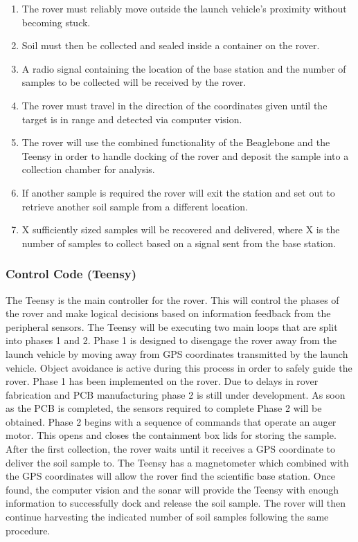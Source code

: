 \documentclass[journal,10pt,draftclsnofoot,onecolumn,compsoc]{IEEEtran} \usepackage[margin=0.75in]{geometry}
\begin{document}
\begin{enumerate}
    \item The rover must reliably move outside the launch vehicle’s proximity without becoming stuck. 
    \item Soil must then be collected and sealed inside a container on the rover. 
    \item A radio signal containing the location of the base station and the number of samples to be collected will be received by the rover. 
    \item The rover must travel in the direction of the coordinates given until the target is in range and detected via computer vision.
    \item The rover will use the combined functionality of the Beaglebone and the Teensy in order to handle docking of the rover and deposit the sample into a collection chamber for analysis.
    \item If another sample is required the rover will exit the station and set out to retrieve another soil sample from a different location. 
    \item X sufficiently sized samples will be recovered and delivered, where X is the number of samples to collect based on a signal sent from the base station. 
\end{enumerate}


\subsubsection{ Control Code (Teensy)}

The Teensy is the main controller for the rover. This will control the phases of the rover and make logical decisions based on information feedback from the peripheral sensors. The Teensy will be executing two main loops that are split into phases 1 and 2. Phase 1 is designed to disengage the rover away from the launch vehicle by moving away from GPS coordinates transmitted by the launch vehicle. Object avoidance is active during this process in order to safely guide the rover. Phase 1 has been implemented on the rover. Due to delays in rover fabrication and PCB manufacturing phase 2 is still under development. As soon as the PCB is completed,  the sensors required to complete Phase 2 will be obtained. Phase 2 begins with a sequence of commands that operate an auger motor. This opens and closes the containment box lids for storing the sample. After the first collection, the rover waits until it receives a GPS coordinate to deliver the soil sample to. The Teensy has a magnetometer which combined with the GPS coordinates will allow the rover find the scientific base station. Once found, the computer vision and the sonar will provide the Teensy with enough information to successfully dock and release the soil sample. The rover will then continue harvesting the indicated number of soil samples following the same procedure. 
\end{document}
